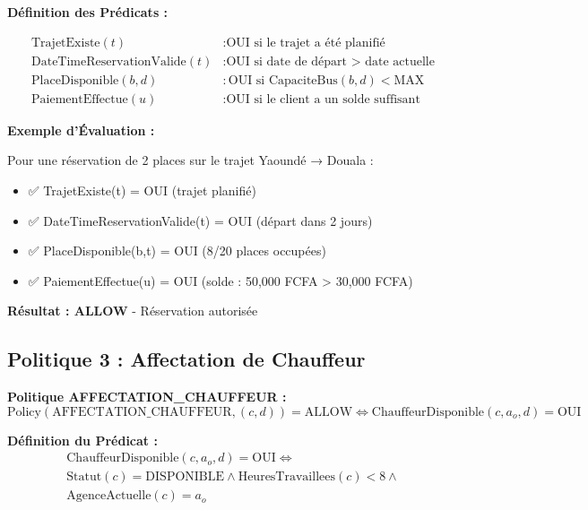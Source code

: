 \documentclass[12pt,a4paper]{article}
\begin{document}
    \textbf{Définition des Prédicats :}

    \begin{align}
        \text{TrajetExiste}(t) &: \text{OUI si le trajet a été planifié} \\
        \text{DateTimeReservationValide}(t) &: \text{OUI si date de départ > date actuelle} \\
        \text{PlaceDisponible}(b, d) &: \text{OUI si CapaciteBus}(b, d) < \text{MAX} \\
        \text{PaiementEffectue}(u) &: \text{OUI si le client a un solde suffisant}
    \end{align}

    \begin{resultbox}
        \textbf{Exemple d'Évaluation :}

        Pour une réservation de 2 places sur le trajet Yaoundé → Douala :
        \begin{itemize}
            \item ✅ TrajetExiste(t) = OUI (trajet planifié)
            \item ✅ DateTimeReservationValide(t) = OUI (départ dans 2 jours)
            \item ✅ PlaceDisponible(b,t) = OUI (8/20 places occupées)
            \item ✅ PaiementEffectue(u) = OUI (solde : 50,000 FCFA > 30,000 FCFA)
        \end{itemize}

        \textbf{Résultat : ALLOW} - Réservation autorisée
    \end{resultbox}

    \subsection{Politique 3 : Affectation de Chauffeur}

    \begin{definitionbox}
        \textbf{Politique AFFECTATION\_CHAUFFEUR :}
        \begin{equation}
            \text{Policy}(\text{AFFECTATION\_CHAUFFEUR}, (c, d)) = \text{ALLOW} \Leftrightarrow \text{ChauffeurDisponible}(c, a_o, d) = \text{OUI}
        \end{equation}
    \end{definitionbox}

    \textbf{Définition du Prédicat :}
    \begin{multline}
        \text{ChauffeurDisponible}(c, a_o, d) = \text{OUI} \Leftrightarrow \\
        \text{Statut}(c) = \text{DISPONIBLE} \wedge \text{HeuresTravaillees}(c) < 8 \wedge \\
        \text{AgenceActuelle}(c) = a_o
    \end{multline}
\end{document}
